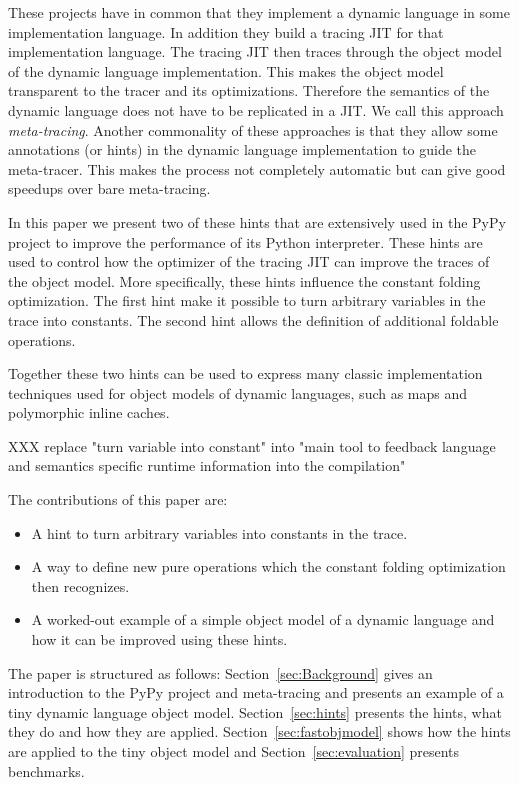 \documentclass{sigplanconf}
\begin{document}
These projects have in common that they implement a dynamic language in some
implementation language. In addition they build a tracing JIT for that implementation
language. The tracing JIT then traces through the object model of the dynamic
language implementation. This makes the object model transparent to the tracer
and its optimizations. Therefore the semantics of the dynamic language does not
have to be replicated in a JIT. We call this approach \emph{meta-tracing}.
Another commonality of these approaches is that they allow some annotations (or
hints) in the dynamic language implementation to guide the meta-tracer. This
makes the process not completely automatic but can give good speedups over
bare meta-tracing.

In this paper we present two of these hints that are extensively used in the
PyPy project to improve the performance of its Python interpreter. These
hints are used to control how the optimizer of the tracing JIT can improve the
traces of the object model. More specifically, these hints influence the
constant folding optimization. The first hint make it possible to turn arbitrary
variables in the trace into constants. The second hint allows the definition of
additional foldable operations.

Together these two hints can be used to express many classic implementation
techniques used for object models of dynamic languages, such as maps and
polymorphic inline caches.

XXX replace "turn variable into constant" into "main tool to feedback language
and semantics specific runtime information into the compilation"

The contributions of this paper are:
\begin{itemize}
 \item A hint to turn arbitrary variables into constants in the trace.
 \item A way to define new pure operations which the constant folding
 optimization then recognizes.
 \item A worked-out example of a simple object model of a dynamic language and
 how it can be improved using these hints.
\end{itemize}

The paper is structured as follows: Section~\ref{sec:Background} gives an
introduction to the PyPy project and meta-tracing and presents an example of a
tiny dynamic language object model. Section~\ref{sec:hints} presents the hints,
what they do and how they are applied. Section~\ref{sec:fastobjmodel} shows how
the hints are applied to the tiny object model and Section~\ref{sec:evaluation}
presents benchmarks.
\end{document}

